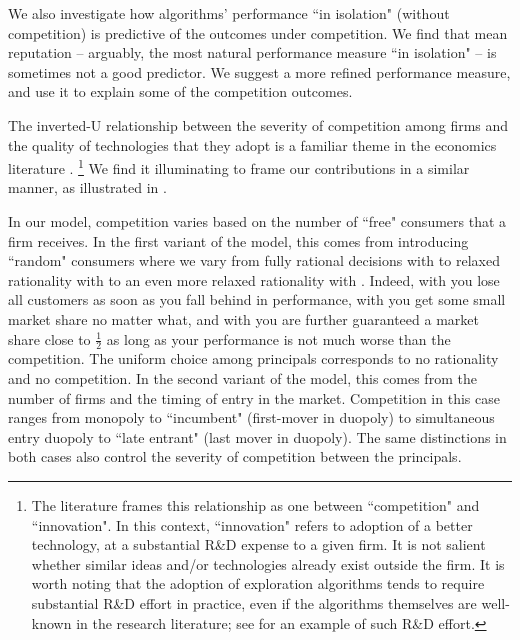 {We also investigate how algorithms' performance ``in isolation" (without competition) is predictive of the outcomes under competition. We find that mean reputation -- arguably, the most natural performance measure ``in isolation" -- is sometimes not a good predictor. We suggest a
more refined performance measure, and use it to explain some of the competition outcomes.

The inverted-U relationship between the severity of competition among firms and the quality of technologies that they adopt is a familiar theme in the economics literature \citep[\eg][]{Aghion-QJE05,Vives-08}.%
\footnote{The literature frames this relationship as one between ``competition" and ``innovation". In this context, ``innovation" refers to adoption of a better technology, at a substantial R\&D expense to a given firm. It is not salient whether similar ideas and/or technologies already exist outside the firm. It is worth noting that the adoption of exploration algorithms tends to require substantial R\&D effort in practice, even if the algorithms themselves are well-known in the research literature; see \citet{MWT-WhitePaper-2016} for an example of such R\&D effort.}
We find it illuminating to frame our contributions in a similar manner, as illustrated in .

In our model, competition varies based on the number of ``free" consumers that a firm receives. In the first variant of the model, this comes from introducing ``random" consumers where we vary from fully rational decisions with \HardMax to relaxed rationality with \HardMaxRandom to an even more relaxed rationality with \SoftMaxRandom. Indeed, with \HardMax you lose all customers as soon as you fall behind in performance, with \HardMaxRandom you get some small market share no matter what, and with \SoftMaxRandom you are further guaranteed a market share close to $\tfrac12$ as long as your performance is not much worse than the competition. The uniform choice among principals corresponds to no rationality and no competition. In the second variant of the model, this comes from the number of firms and the timing of entry in the market. Competition in this case ranges from monopoly to ``incumbent" (first-mover in duopoly) to simultaneous entry duopoly to ``late entrant" (last mover in duopoly). The same distinctions in both cases also control the severity of competition between the principals.

}
